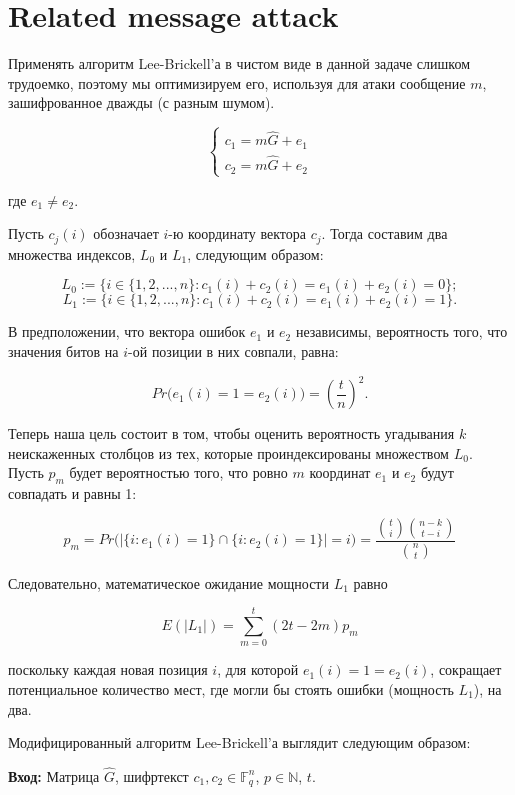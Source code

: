 \documentclass[12pt,a4paper]{scrartcl}
\begin{document}
\section{Related message attack}

Применять алгоритм Lee-Brickell'а в чистом виде в данной задаче слишком трудоемко, поэтому мы оптимизируем его, используя для атаки сообщение $m$, зашифрованное дважды (с разным шумом).

\begin{equation*}
	\begin{cases}
		c_1 = m \hat{G} + e_1\\
		c_2 = m \hat{G} + e_2
	\end{cases}
\end{equation*}

где $e_1 \neq e_2$.


Пусть $c_j(i)$ обозначает $i$-ю координату вектора $c_j$. Тогда составим два множества индексов, $L_0$ и $L_1$, следующим образом:

$$L_0 := \{i \in \{1, 2,..., n\} : c_1(i) + c_2(i) = e_1(i) + e_2(i) = 0\};$$
$$L_1 := \{i \in \{1, 2,..., n\} : c_1(i) + c_2(i) = e_1(i) + e_2(i) = 1\}.$$

В предположении, что вектора ошибок $e_1$ и $e_2$ независимы, вероятность того, что значения битов на $i$-ой позиции в них совпали, равна:

$$Pr\Big(e_1(i)=1=e_2(i)\Big) = \left( \dfrac{t}{n} \right)^{2}.$$

Теперь наша цель состоит в том, чтобы оценить вероятность угадывания $k$ неискаженных столбцов из тех, которые проиндексированы множеством $L_0$. Пусть $p_m$ будет вероятностью того, что ровно $m$ координат $e_1$ и $e_2$ будут совпадать и равны 1:

$$p_m = Pr\Big(| \{ i:e_1(i)=1 \} \cap \{ i:e_2(i)=1 \} |=i\Big) = \dfrac{\binom{t}{i}\binom{n-k}{t-i}}{\binom{n}{t}}$$

Следовательно, математическое ожидание мощности $L_1$ равно

$$E(|L_1|)=\sum_{m=0}^{t}(2t-2m)p_m$$

поскольку каждая новая позиция $i$, для которой $e_1(i)=1=e_2(i)$, сокращает потенциальное количество мест, где могли бы стоять ошибки (мощность $L_1$), на два.

Модифицированный алгоритм Lee-Brickell'а выглядит следующим образом:

\textbf{Вход:} Матрица $\hat{G}$, шифртекст $c_1, c_2 \in \mathbb{F}_q^n$, $p \in \mathbb{N}$, $t$.
\end{document}
